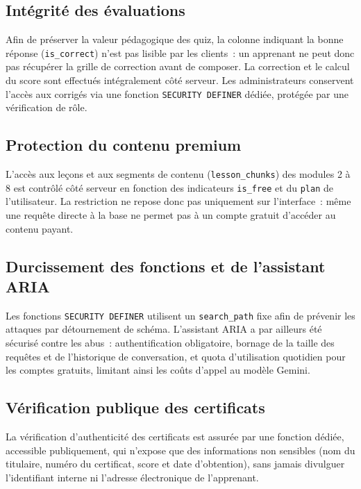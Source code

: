 \documentclass[12pt, a4paper]{report}
\begin{document}
\subsection{Intégrité des évaluations}

Afin de préserver la valeur pédagogique des quiz, la colonne indiquant la
bonne réponse (\texttt{is\_correct}) n'est pas lisible par les clients~: un
apprenant ne peut donc pas récupérer la grille de correction avant de composer.
La correction et le calcul du score sont effectués intégralement côté serveur.
Les administrateurs conservent l'accès aux corrigés via une fonction
\texttt{SECURITY DEFINER} dédiée, protégée par une vérification de rôle.

\subsection{Protection du contenu premium}

L'accès aux leçons et aux segments de contenu (\texttt{lesson\_chunks}) des
modules 2 à 8 est contrôlé côté serveur en fonction des indicateurs
\texttt{is\_free} et du \texttt{plan} de l'utilisateur. La restriction ne repose
donc pas uniquement sur l'interface~: même une requête directe à la base ne
permet pas à un compte gratuit d'accéder au contenu payant.

\subsection{Durcissement des fonctions et de l'assistant ARIA}

Les fonctions \texttt{SECURITY DEFINER} utilisent un \texttt{search\_path} fixe
afin de prévenir les attaques par détournement de schéma. L'assistant ARIA a
par ailleurs été sécurisé contre les abus~: authentification obligatoire,
bornage de la taille des requêtes et de l'historique de conversation, et quota
d'utilisation quotidien pour les comptes gratuits, limitant ainsi les coûts
d'appel au modèle Gemini.

\subsection{Vérification publique des certificats}

La vérification d'authenticité des certificats est assurée par une fonction
dédiée, accessible publiquement, qui n'expose que des informations non
sensibles (nom du titulaire, numéro du certificat, score et date d'obtention),
sans jamais divulguer l'identifiant interne ni l'adresse électronique de
l'apprenant.
\end{document}
